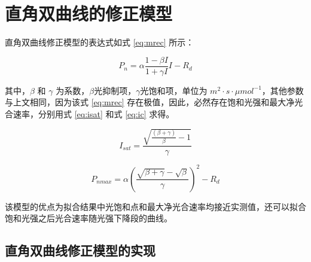 \documentclass[
]{krantz}
\begin{document}
\cleardoublepage

\hypertarget{rev_rec}{%
\section{直角双曲线的修正模型}\label{rev_rec}}

\citet{YEZiPiao2010} 直角双曲线修正模型的表达式如式 \eqref{eq:mrec} 所示：

\begin{equation}
P_{n} = \alpha \frac{1-\beta I}{1+\gamma I} I - R_{d}
\label{eq:mrec}
\end{equation}

其中，\(\beta\) 和 \(\gamma\) 为系数，\(\beta\)光抑制项，\(\gamma\)光饱和项，单位为
\(m^{2}\cdot s\cdot\mu mol^{-1}\)，其他参数与上文相同，因为该式 \eqref{eq:mrec}
存在极值，因此，必然存在饱和光强和最大净光合速率，分别用式 \eqref{eq:isat} 和式 \eqref{eq:ic} 求得。

\begin{equation}
I_{sat} = \frac{\sqrt{\frac{(\beta+\gamma)}{\beta}-1}}{\gamma}
\label{eq:isat}
\end{equation}

\begin{equation}
P_{nmax} = \alpha\left(\frac{\sqrt{\beta+\gamma}-\sqrt{\beta}}{\gamma}\right)^{2}-R_{d}
\label{eq:ic}
\end{equation}

该模型的优点为拟合结果中光饱和点和最大净光合速率均接近实测值，还可以拟合饱和光强之后光合速率随光强下降段的曲线。

\hypertarget{rev_rec_exam}{%
\subsection{直角双曲线修正模型的实现}\label{rev_rec_exam}}
\end{document}
